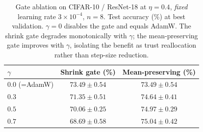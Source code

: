 \begin{table}[!ht]
\centering
\footnotesize
\setlength{\tabcolsep}{6.0pt}
\renewcommand{\arraystretch}{1.15}
\caption{Gate ablation on CIFAR-10 / ResNet-18 at $\eta=0.4$, \emph{fixed} learning rate $3\times10^{-4}$, $n=8$. Test accuracy (\%) at best validation. $\gamma=0$ disables the gate and equals AdamW. The shrink gate degrades monotonically with $\gamma$; the mean-preserving gate improves with $\gamma$, isolating the benefit as trust reallocation rather than step-size reduction.}
\label{tab:ablation}
\begin{tabular}{lcc}
\toprule
\textbf{$\gamma$} & \textbf{Shrink gate (\%)} & \textbf{Mean-preserving (\%)} \\
\midrule
$0.0$ (=AdamW) & $73.49 \pm 0.54$ & $73.49 \pm 0.54$ \\
$0.3$          & $71.35 \pm 0.51$ & $74.64 \pm 0.41$ \\
$0.5$          & $70.06 \pm 0.25$ & $\mathbf{74.97 \pm 0.29}$ \\
$0.7$          & $68.69 \pm 0.58$ & $75.04 \pm 0.42$ \\
\bottomrule
\end{tabular}
\end{table}
